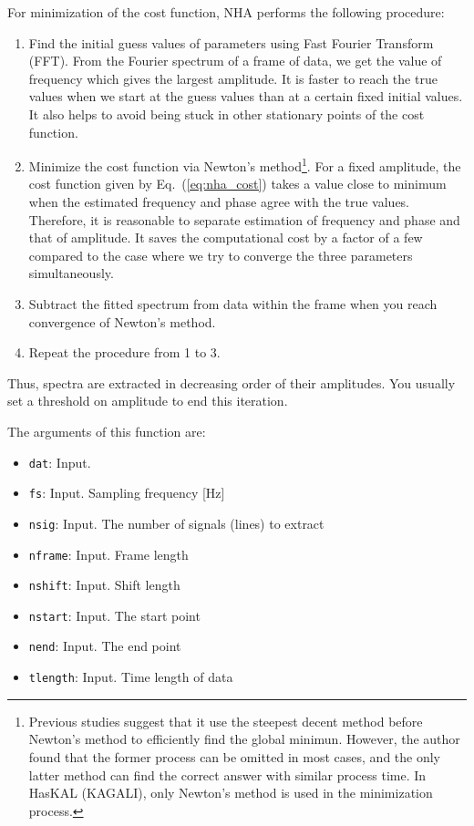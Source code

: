 For minimization of the cost function, NHA performs the following procedure:

\begin{enumerate}
\item
Find the initial guess values of parameters using Fast Fourier Transform (FFT). From the Fourier spectrum of a frame of data, we get the value of frequency which gives the largest amplitude. It is faster to reach the true values when we start at the guess values than at a certain fixed initial values. It also helps to avoid being stuck in other stationary points of the cost function.
\item
Minimize the cost function via Newton's method\footnote{Previous studies suggest that it use the steepest decent method before Newton's method to efficiently find the global minimun. However, the author found that the former process can be omitted in most cases, and the only latter method can find the correct answer with similar process time. In HasKAL (KAGALI), only Newton's method is used in the minimization process.}. For a fixed amplitude, the cost function given by Eq.~(\ref{eq:nha_cost}) takes a value close to minimum when the estimated frequency and phase agree with the true values. Therefore, it is reasonable to separate estimation of frequency and phase and that of amplitude. It saves the computational cost by a factor of a few compared to the case where we try to converge the three parameters simultaneously.
\item
Subtract the fitted spectrum from data within the frame when you reach convergence of Newton's method.
\item
Repeat the procedure from 1 to 3.
\end{enumerate}
Thus, spectra are extracted in decreasing order of their amplitudes. You usually set a threshold on amplitude to end this iteration.

\vspace{1cm}
The arguments of this function are:
\begin{itemize}
\item {\tt dat}: Input.
\item {\tt fs}: Input. Sampling frequency [Hz]
\item {\tt nsig}: Input. The number of signals (lines) to extract
\item {\tt nframe}: Input. Frame length
\item {\tt nshift}: Input. Shift length
\item {\tt nstart}: Input. The start point
\item {\tt nend}: Input. The end point
\item {\tt tlength}: Input. Time length of data
\end{itemize}


